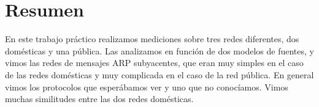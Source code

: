 \section{Resumen}

En este trabajo práctico realizamos mediciones sobre tres redes diferentes, dos domésticas y una pública. Las analizamos en función de dos modelos de fuentes, y vimos las redes de mensajes ARP subyacentes, que eran muy simples en el caso de las redes domésticas y muy complicada en el caso de la red pública. En general vimos los protocolos que esperábamos ver y uno que no conocíamos. Vimos muchas similitudes entre las dos redes domésticas.
